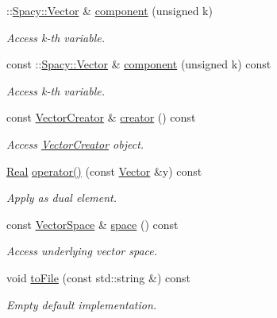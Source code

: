 \begin{DoxyCompactItemize}
\item 
\+::\hyperlink{classSpacy_1_1Vector}{Spacy\+::\+Vector} \& \hyperlink{classSpacy_1_1ProductSpace_1_1Vector_afc232dee8726e5b2e4973bb323f96ce0}{component} (unsigned k)
\begin{DoxyCompactList}\small\item\em Access k-\/th variable. \end{DoxyCompactList}\item 
const \+::\hyperlink{classSpacy_1_1Vector}{Spacy\+::\+Vector} \& \hyperlink{classSpacy_1_1ProductSpace_1_1Vector_acbd9aa2a7af0724e8091e89ae818b6ee}{component} (unsigned k) const 
\begin{DoxyCompactList}\small\item\em Access k-\/th variable. \end{DoxyCompactList}\item 
const \hyperlink{classSpacy_1_1ProductSpace_1_1VectorCreator}{Vector\+Creator} \& \hyperlink{classSpacy_1_1ProductSpace_1_1Vector_a893de5e5a2bb37d2d512c035b0ad91ea}{creator} () const 
\begin{DoxyCompactList}\small\item\em Access \hyperlink{classSpacy_1_1ProductSpace_1_1VectorCreator}{Vector\+Creator} object. \end{DoxyCompactList}\item 
\hyperlink{classSpacy_1_1Real}{Real} \hyperlink{classSpacy_1_1ProductSpace_1_1Vector_a76456c8d29f06dd24bf67e941edaba9d}{operator()} (const \hyperlink{classSpacy_1_1ProductSpace_1_1Vector}{Vector} \&y) const 
\begin{DoxyCompactList}\small\item\em Apply as dual element. \end{DoxyCompactList}\item 
\hypertarget{classSpacy_1_1VectorBase_aa999dbf9d679d895dfe04c10fbf9f5e9}{}const \hyperlink{classSpacy_1_1VectorSpace}{Vector\+Space} \& \hyperlink{classSpacy_1_1VectorBase_aa999dbf9d679d895dfe04c10fbf9f5e9}{space} () const \label{classSpacy_1_1VectorBase_aa999dbf9d679d895dfe04c10fbf9f5e9}

\begin{DoxyCompactList}\small\item\em Access underlying vector space. \end{DoxyCompactList}\item 
\hypertarget{classSpacy_1_1VectorBase_a244a3e85ec49dbf2741ca46ea4b711c9}{}void \hyperlink{classSpacy_1_1VectorBase_a244a3e85ec49dbf2741ca46ea4b711c9}{to\+File} (const std\+::string \&) const \label{classSpacy_1_1VectorBase_a244a3e85ec49dbf2741ca46ea4b711c9}

\begin{DoxyCompactList}\small\item\em Empty default implementation. \end{DoxyCompactList}\end{DoxyCompactItemize}


